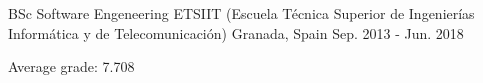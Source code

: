 

\begin{cventries}

  \cventry
    {BSc Software Engeneering} %
    {ETSIIT (Escuela Técnica Superior de Ingenierías Informática y de Telecomunicación)} %
    {Granada, Spain} %
    {Sep. 2013 - Jun. 2018} %
    {
      \begin{cvitems} %
        \item {Average grade: 7.708}
      \end{cvitems}
    }

\end{cventries}
